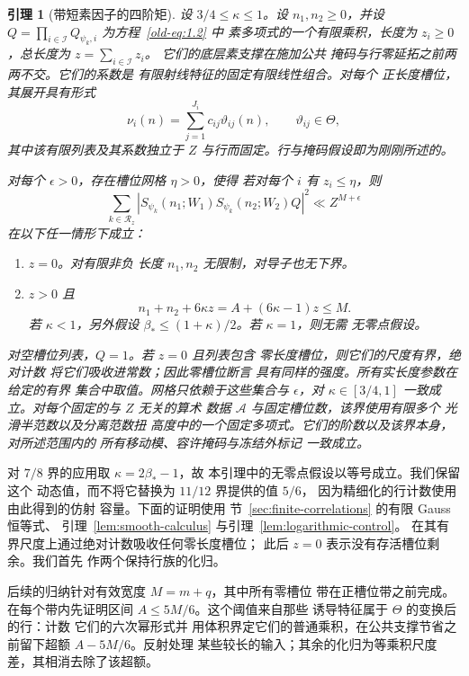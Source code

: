\documentclass[11pt,a4paper]{article}
\numberwithin{equation}{section}
\numberwithin{figure}{section}
\newtheorem{lemma}[theorem]{引理}
\theoremstyle{definition}
\theoremstyle{remark}
\begin{document}
\begin{lemma}[带短素因子的四阶矩]\label{lem:plain}
设 \(3/4\le\kappa\le1\)。设 \(n_1,n_2\ge0\)，并设
\(Q=\prod_{i\in\mathcal I}Q_{\psi_k,i}\) 为方程~\eqref{old-eq:1.2} 中
素多项式的一个有限乘积，长度为
\(z_i\ge0\)，总长度为 \(z=\sum_{i\in\mathcal I}z_i\)。
它们的底层素支撑在施加公共
掩码与行零延拓之前两两不交。它们的系数是
有限射线特征的固定有限线性组合。对每个
正长度槽位，其展开具有形式
\[
 \nu_i(n)=\sum_{j=1}^{J_i}c_{ij}\vartheta_{ij}(n),
 \qquad\vartheta_{ij}\in\Theta,
\]
其中该有限列表及其系数独立于
\(Z\) 与行而固定。行与掩码假设即为刚刚所述的。

对每个 \(\epsilon>0\)，存在槽位网格 \(\eta>0\)，使得
若对每个 \(i\) 有 \(z_i\le\eta\)，则
\begin{equation}
 \sum_{k\in\mathcal R_z}
 \left|S_{\psi_k}(n_1;W_1)S_{\psi_k}(n_2;W_2)Q\right|^2
 \ll Z^{M+\epsilon}
 \label{old-eq:2.1}
\end{equation}
在以下任一情形下成立：
\begin{enumerate}
\item \(z=0\)。对有限非负
      长度 \(n_1,n_2\) 无限制，对导子也无下界。
\item \(z>0\) 且
\begin{equation}
 n_1+n_2+6\kappa z=A+(6\kappa-1)z\le M.
 \label{old-eq:3.9}
\end{equation}
      若 \(\kappa<1\)，另外假设
      \(\beta_*\le(1+\kappa)/2\)。若 \(\kappa=1\)，则无需
      无零点假设。
\end{enumerate}
对空槽位列表，\(Q=1\)。若 \(z=0\) 且列表包含
零长度槽位，则它们的尺度有界，绝对计数
将它们吸收进常数；因此零槽位断言
具有同样的强度。所有实长度参数在给定的有界
集合中取值。网格只依赖于这些集合与 \(\epsilon\)，对
\(\kappa\in[3/4,1]\) 一致成立。对每个固定的与 \(Z\) 无关的算术
数据 \(\mathcal A\) 与固定槽位数，该界使用有限多个
光滑半范数以及分离范数扭
高度中的一个固定多项式。它们的阶数以及该界本身，对所述范围内的
所有移动模、容许掩码与冻结外标记
一致成立。
\end{lemma}

对 \(7/8\) 界的应用取 \(\kappa=2\beta_*-1\)，故
本引理中的无零点假设以等号成立。我们保留这个
动态值，而不将它替换为 \(11/12\) 界提供的值 \(5/6\)，
因为精细化的行计数使用由此得到的仿射
容量。下面的证明使用
节~\ref{sec:finite-correlations} 的有限 Gauss 恒等式、
引理~\ref{lem:smooth-calculus} 与引理~\ref{lem:logarithmic-control}。
在其有界尺度上通过绝对计数吸收任何零长度槽位；
此后 \(z=0\) 表示没有存活槽位剩余。我们首先
作两个保持行族的化归。

后续的归纳针对有效宽度 \(M=m+q\)，其中所有零槽位
带在正槽位带之前完成。在每个带内先证明区间
\(A\le5M/6\)。这个阈值来自那些
诱导特征属于 \(\Theta\) 的变换后的行：计数
它们的六次幂形式并
用体积界定它们的普通乘积，在公共支撑节省之前留下超额
\(A-5M/6\)。反射处理
某些较长的输入；其余的化归为等乘积尺度
差，其相消去除了该超额。
\end{document}
